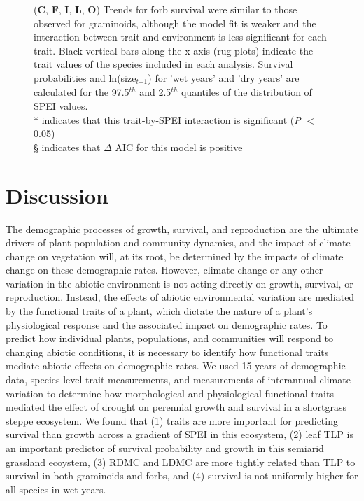 \documentclass[12pt, letterpaper]{article}
\begin{document}
\begin{figure}
{(\textbf{C}, \textbf{F}, \textbf{I}, \textbf{L}, \textbf{O}) Trends for forb survival were similar to those observed for graminoids, although the model fit is weaker and the interaction between trait and environment is less significant for each trait. %
Black vertical bars along the x-axis (rug plots) indicate the trait values of the species included in each analysis. Survival probabilities and ln(size$_\textit{t+1}$) for 'wet years' and 'dry years' are calculated for the 97.5$^{th}$ and 2.5$^{th}$ quantiles of the distribution of SPEI values. \\
* indicates that this trait-by-SPEI interaction is significant (\textit{P} $<$ 0.05)\\
§ indicates that $\Delta$ AIC for this model is positive
}
 \label{fig:test}
\end{figure}

\section{Discussion}
The demographic processes of growth, survival, and reproduction are the ultimate drivers of plant population and community dynamics, and the impact of climate change on vegetation will, at its root, be determined by the impacts of climate change on these demographic rates. However, climate change or any other variation in the abiotic environment is not acting directly on growth, survival, or reproduction. Instead, the effects of abiotic environmental variation are mediated by the functional traits of a plant, which dictate the nature of a plant's physiological response and the associated impact on demographic rates. To predict how individual plants, populations, and communities will respond to changing abiotic conditions, it is necessary to identify how functional traits mediate abiotic effects on demographic rates. We used 15 years of demographic data, species-level trait measurements, and measurements of interannual climate variation to determine how morphological and physiological functional traits mediated the effect of drought on perennial growth and survival in a shortgrass steppe ecosystem. We found that (1) traits are more important for predicting survival than growth across a gradient of SPEI in this ecosystem, (2) leaf TLP is an important predictor of survival probability and growth in this semiarid grassland ecoystem, (3) RDMC and LDMC are  more tightly related than TLP to survival in both graminoids and forbs, and (4) survival is not uniformly higher for all species in wet years. 
\end{document}
